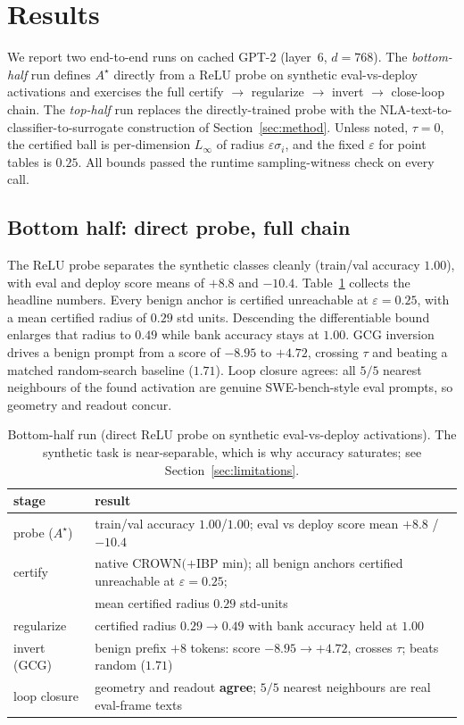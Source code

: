 \section{Results}
\label{sec:results}

We report two end-to-end runs on cached GPT-2 (layer~6, $d=768$). The
\emph{bottom-half} run defines $A^\star$ directly from a ReLU probe on synthetic
eval-vs-deploy activations and exercises the full certify $\to$ regularize $\to$
invert $\to$ close-loop chain. The \emph{top-half} run replaces the directly-trained
probe with the NLA-text-to-classifier-to-surrogate construction of
Section~\ref{sec:method}. Unless noted, $\tau = 0$, the certified ball is
per-dimension $L_\infty$ of radius $\varepsilon\sigma_i$, and the fixed $\varepsilon$
for point tables is $0.25$. All bounds passed the runtime sampling-witness check on
every call.

\subsection{Bottom half: direct probe, full chain}

The ReLU probe separates the synthetic classes cleanly (train/val accuracy $1.00$),
with eval and deploy score means of $+8.8$ and $-10.4$. Table~\ref{tab:bottom}
collects the headline numbers. Every benign anchor is certified unreachable at
$\varepsilon=0.25$, with a mean certified radius of $0.29$ std units. Descending the
differentiable bound enlarges that radius to $0.49$ while bank accuracy stays at
$1.00$. GCG inversion drives a benign prompt from a score of $-8.95$ to $+4.72$,
crossing $\tau$ and beating a matched random-search baseline ($1.71$). Loop closure
agrees: all $5/5$ nearest neighbours of the found activation are genuine
SWE-bench-style eval prompts, so geometry and readout concur.

\begin{table}[t]
\centering
\caption{Bottom-half run (direct ReLU probe on synthetic eval-vs-deploy
activations). The synthetic task is near-separable, which is why accuracy
saturates; see Section~\ref{sec:limitations}.}
\label{tab:bottom}
\small
\begin{tabular}{@{}ll@{}}
\toprule
\textbf{stage} & \textbf{result} \\
\midrule
probe ($A^\star$) & train/val accuracy $1.00$/$1.00$; eval vs deploy score mean $+8.8$ / $-10.4$ \\
certify & native CROWN$(+$IBP min); all benign anchors certified unreachable at $\varepsilon=0.25$; \\
        & mean certified radius $\mathbf{0.29}$ std-units \\
regularize & certified radius $\mathbf{0.29 \to 0.49}$ with bank accuracy held at $1.00$ \\
invert (GCG) & benign prefix $+8$ tokens: score $\mathbf{-8.95 \to +4.72}$, crosses $\tau$; beats random ($1.71$) \\
loop closure & geometry and readout \textbf{agree}; $5/5$ nearest neighbours are real eval-frame texts \\
\bottomrule
\end{tabular}
\end{table}

